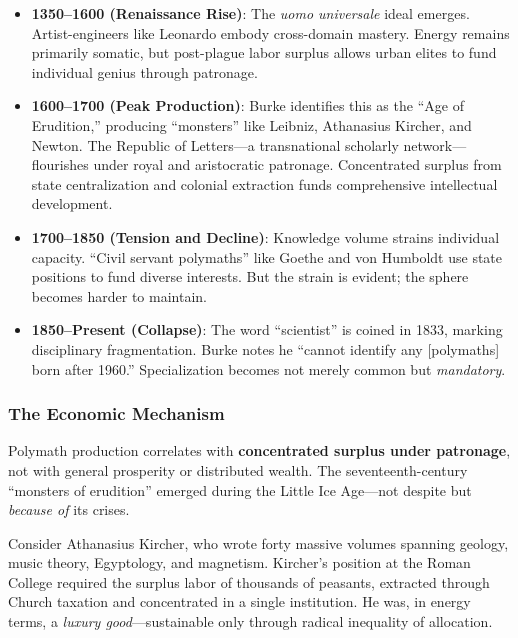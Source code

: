 \begin{itemize}
    \item \textbf{1350--1600 (Renaissance Rise)}: The \textit{uomo universale} ideal emerges. Artist-engineers like Leonardo embody cross-domain mastery. Energy remains primarily somatic, but post-plague labor surplus allows urban elites to fund individual genius through patronage.
    
    \item \textbf{1600--1700 (Peak Production)}: Burke identifies this as the ``Age of Erudition,'' producing ``monsters'' like Leibniz, Athanasius Kircher, and Newton. The Republic of Letters---a transnational scholarly network---flourishes under royal and aristocratic patronage. Concentrated surplus from state centralization and colonial extraction funds comprehensive intellectual development.
    
    \item \textbf{1700--1850 (Tension and Decline)}: Knowledge volume strains individual capacity. ``Civil servant polymaths'' like Goethe and von Humboldt use state positions to fund diverse interests. But the strain is evident; the sphere becomes harder to maintain.
    
    \item \textbf{1850--Present (Collapse)}: The word ``scientist'' is coined in 1833, marking disciplinary fragmentation. Burke notes he ``cannot identify any [polymaths] born after 1960.'' Specialization becomes not merely common but \textit{mandatory}.
\end{itemize}

\subsubsection{The Economic Mechanism}

Polymath production correlates with \textbf{concentrated surplus under patronage}, not with general prosperity or distributed wealth. The seventeenth-century ``monsters of erudition'' emerged during the Little Ice Age---not despite but \textit{because of} its crises.

Consider Athanasius Kircher, who wrote forty massive volumes spanning geology, music theory, Egyptology, and magnetism. Kircher's position at the Roman College required the surplus labor of thousands of peasants, extracted through Church taxation and concentrated in a single institution. He was, in energy terms, a \textit{luxury good}---sustainable only through radical inequality of allocation.

